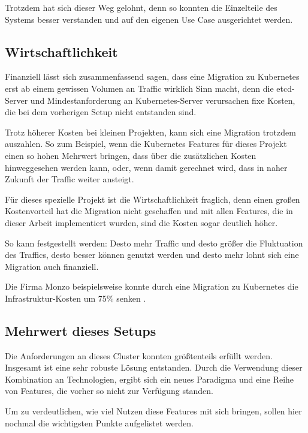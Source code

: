 Trotzdem hat sich dieser Weg gelohnt, denn so konnten die Einzelteile des
Systems besser verstanden und auf den eigenen
Use Case ausgerichtet werden.

\subsection{Wirtschaftlichkeit}

Finanziell l\"asst sich zusammenfassend sagen, dass eine Migration zu Kubernetes
erst ab einem gewissen Volumen an Traffic wirklich Sinn macht, denn die
etcd-Server und Mindestanforderung an Kubernetes-Server verursachen fixe
Kosten, die bei dem vorherigen
Setup nicht entstanden sind.

Trotz h\"oherer Kosten bei kleinen Projekten, kann sich eine Migration trotzdem
auszahlen. So zum Beispiel, wenn die Kubernetes Features f\"ur dieses Projekt
einen so hohen Mehrwert bringen, dass \"uber die zus\"atzlichen Kosten
hinweggesehen werden kann, oder, wenn damit gerechnet wird, dass in naher
Zukunft der Traffic weiter ansteigt.

F\"ur dieses spezielle Projekt ist die Wirtschaftlichkeit fraglich, denn einen
großen Kostenvorteil hat die Migration nicht geschaffen und mit allen Features,
die in dieser Arbeit implementiert wurden, sind die Kosten sogar deutlich h\"oher.

So kann festgestellt werden: Desto mehr Traffic und desto gr\"oßer die Fluktuation
des Traffics, desto besser k\"onnen
 \cite{cloudmigra}
genutzt werden und desto mehr lohnt sich eine
Migration auch finanziell.

Die Firma Monzo beispielsweise konnte durch eine
Migration zu Kubernetes die
Infrastruktur-Kosten um 75\% senken \cite{bankingbackend}.

\subsection{Mehrwert dieses Setups}

Die Anforderungen an dieses Cluster konnten größtenteils erf\"ullt werden.
Insgesamt ist eine sehr robuste L\"osung entstanden.
Durch die Verwendung dieser Kombination an Technologien, ergibt sich ein neues Paradigma
und eine Reihe von Features, die vorher so nicht zur Verf\"ugung standen.

Um zu verdeutlichen, wie viel Nutzen diese Features mit sich bringen, sollen
hier nochmal die wichtigsten Punkte aufgelistet werden.

